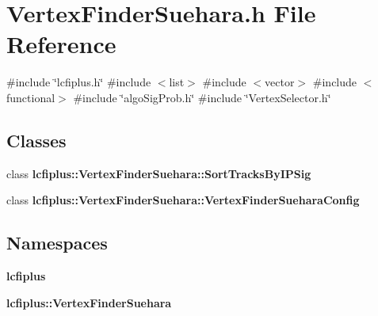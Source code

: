 \section{Vertex\+Finder\+Suehara.\+h File Reference}
\label{VertexFinderSuehara_8h}
{\ttfamily \#include \char`\"{}lcfiplus.\+h\char`\"{}}\newline
{\ttfamily \#include $<$list$>$}\newline
{\ttfamily \#include $<$vector$>$}\newline
{\ttfamily \#include $<$functional$>$}\newline
{\ttfamily \#include \char`\"{}algo\+Sig\+Prob.\+h\char`\"{}}\newline
{\ttfamily \#include \char`\"{}Vertex\+Selector.\+h\char`\"{}}\newline
\subsection*{Classes}
\begin{DoxyCompactItemize}
\item 
class \textbf{ lcfiplus\+::\+Vertex\+Finder\+Suehara\+::\+Sort\+Tracks\+By\+I\+P\+Sig}
\item 
class \textbf{ lcfiplus\+::\+Vertex\+Finder\+Suehara\+::\+Vertex\+Finder\+Suehara\+Config}
\end{DoxyCompactItemize}
\subsection*{Namespaces}
\begin{DoxyCompactItemize}
\item 
 \textbf{ lcfiplus}
\item 
 \textbf{ lcfiplus\+::\+Vertex\+Finder\+Suehara}
\end{DoxyCompactItemize}
